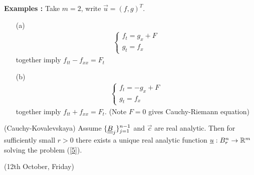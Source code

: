 \documentclass[12pt,a4paper]{report}
\begin{document}
\textbf{Examples :} Take $m=2$, write $\vec{u} = (f, g)^T$.
\begin{itemize}
\item[(a)] \begin{align*}
\begin{cases}
f_t= g_x + F\\
g_t = f_x
\end{cases}
\end{align*}
together imply $f_{tt} - f_{xx} = F_t$
\item[(b)] \begin{align*}
\begin{cases}
f_t= -g_x + F\\
g_t = f_x
\end{cases}
\end{align*}
together imply $f_{tt} + f_{xx} = F_t$. (Note $F=0$ gives Cauchy-Riemann equation)
\end{itemize}
\s

\thm (Cauchy-Kovalevskaya) Assume $\{\underline{\underline{B}}_j \}_{j=1}^{n-1}$ and $\vec{c}$ are real analytic. Then for sufficiently small $r>0$ there exists a unique real analytic function $\underline{u} : B_r^n \rightarrow \mathbb{R}^m$ solving the problem (\ref{5}).
\s

\newday

(12th October, Friday)
\s
\end{document}
